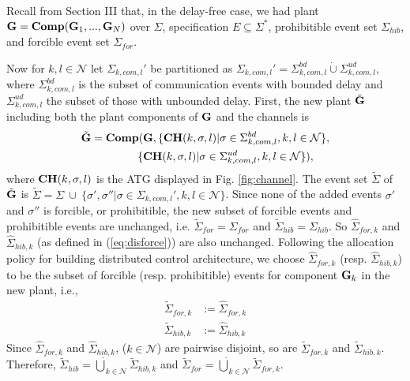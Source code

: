


Recall from Section III that, in the delay-free case, we had
plant ${\bf G} = {\bf Comp} ({\bf G}_1, ..., {\bf G}_N)$ over $\Sigma$,
specification $E \subseteq \Sigma^*$, prohibitible event set $\Sigma_{hib}$,
and forcible event set $\Sigma_{for}$. 

Now for $k,l \in \mathcal{N}$ let $\Sigma_{k,com,l}'$ be partitioned as
$\Sigma_{k,com,l}' = \Sigma_{k,com,l}^{bd} \dot{\cup} \Sigma_{k,com,l}^{ud}$, where
$\Sigma_{k,com,l}^{bd}$
is the subset of communication events with bounded
delay and $\Sigma_{k,com,l}^{ud}$ the subset of those with unbounded delay.
First, the new plant $\tilde{\bf G}$ including both the plant components of $\bf G$ and the channels is
\begin{align} \label{eq:newplant}
\tilde{\bf G} = {\bf Comp}(&{\bf G},\{{\bf CH}(k,\sigma,l)|\sigma
\in \Sigma_{k,com,l}^{bd}, k, l \in \mathcal{N}\}, \notag \\
\{&{\bf CH}(k,\sigma,l)|\sigma \in \Sigma_{k,com,l}^{ud}, k, l \in \mathcal{N}\}),
\end{align}
where ${\bf CH}(k,\sigma,l)$ is the ATG displayed in Fig. \ref{fig:channel}.
The event set $\tilde{\Sigma}$ of $\tilde{\bf G}$ is $\tilde{\Sigma}
= \Sigma ~\cup ~\{\sigma',\sigma''|\sigma \in \Sigma_{k,com,l}', k,l \in \mathcal{N}\}$.
Since none of the added events $\sigma'$ and $\sigma''$ is
forcible, or prohibitible, the new subset of forcible events and prohibitible
events are unchanged, i.e. $\tilde\Sigma_{for} = \Sigma_{for}$ and
$\tilde{\Sigma}_{hib} = \Sigma_{hib}$. So $\hat\Sigma_{for,k}$ and $\hat\Sigma_{hib,k}$
(as defined in (\ref{eq:disforce})) are also unchanged. Following the allocation policy for building distributed
control architecture, we choose $\hat\Sigma_{for,k}$ (resp. $\hat\Sigma_{hib,k}$)
to be the subset of forcible (resp. prohibitible) events for component ${\bf G}_k$ in
the new plant, i.e.,
\begin{align}
\tilde{\Sigma}_{for,k} &:= \hat\Sigma_{for,k} \label{eq:new_forci_event_k}\\
\tilde{\Sigma}_{hib,k} &:= \hat\Sigma_{hib,k} \label{eq:new_prohib_event_k}
\end{align}
Since $\hat\Sigma_{for,k}$ and $\hat\Sigma_{hib,k}$, ($k \in \mathcal{N}$)
are pairwise disjoint, so are  $\tilde\Sigma_{for,k}$ and $\tilde\Sigma_{hib,k}$.
Therefore, $\tilde\Sigma_{hib} = \dot{\bigcup}_{k \in \mathcal{N}} \tilde\Sigma_{hib,k}$
and $\tilde\Sigma_{for} = \dot{\bigcup}_{k \in \mathcal{N}} \tilde\Sigma_{for,k}$.








